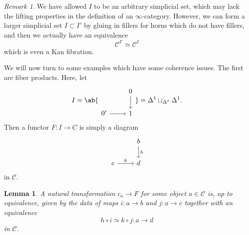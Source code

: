 \documentclass[10pt]{amsart}
\newtheorem{lem}[thm]{Lemma}
\theoremstyle{definition}
\theoremstyle{remark}
\newtheorem{rmk}[thm]{Remark}
\theoremstyle{plain}
\theoremstyle{definition}
\theoremstyle{remark}
\newcommand{\mc}[1]{\mathcal{#1}}
\newcommand{\1}{\mathbf{1}}
\newcommand{\2}{\mathbf{2}}
\newcommand{\3}{\mathbf{3}}
\begin{document}
\begin{rmk}
    We have allowed $I$ to be an arbitrary simplicial set, which may lack the lifting properties in the definition of an $\infty$-category. However, we can form a larger simplicial set $I \subset I'$ by gluing in fillers for horns which do not have fillers, and then we actually have an equivalence
    \[ \mc{C}^{I'} \simeq \mc{C}^I \]
    which is even a Kan fibration.
\end{rmk}

We will now turn to some examples which have some coherence issues. The first are fiber products. Here, let
\begin{equation*}I = \ab\{
\begin{tikzcd}[ampersand replacement=\&]
    \& 0 \ar{d} \\
    0' \ar{r} \& 1
\end{tikzcd} \} = \Delta^1 \sqcup_{\Delta^0} \Delta^1.
\end{equation*}
Then a functor $F \colon I \to C$ is simply a diagram
\begin{equation*}
\begin{tikzcd}
    & b \ar{d}{h} \\
    c \ar{r}{k} & d
\end{tikzcd}
\end{equation*}
in $\mc{C}$.

\begin{lem}
    A natural transformation $c_a \to F$ for some object $a \in \mc{C}$ is, up to equivalence, given by the data of maps $i \colon a \to b$ and $j \colon a \to c$ together with an equivalence
    \[ h \circ i \simeq k \circ j \colon a \to d \]
    in $\mc{C}$. 
\end{lem}
\end{document}
